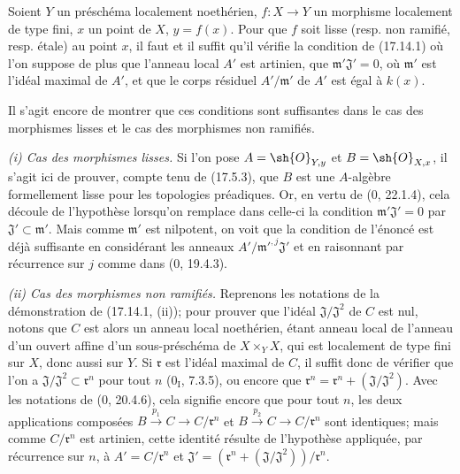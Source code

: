 \begin{proposition}[17.14.2]
\label{IV.17.14.2}
Soient $Y$ un préschéma localement noethérien, $f:X\to Y$ un morphisme localement de type fini, $x$ un point de $X$, $y=f(x)$. Pour que $f$ soit lisse (resp. non ramifié, resp. étale) au point $x$, il faut et il suffit qu'il vérifie la condition de (17.14.1) où l'on suppose de plus que l'anneau local $A'$ est artinien, que $\mathfrak m'\mathfrak{J}'=0$, où $\mathfrak m'$ est l'idéal maximal de $A'$, et que le corps résiduel $A'/\mathfrak m'$ de $A'$ est égal à $k(x)$.
\end{proposition}

Il s'agit encore de montrer que ces conditions sont suffisantes dans le cas des morphismes lisses et le cas des morphismes non ramifiés.


\emph{(i) Cas des morphismes lisses.} Si l'on pose $A=\sh{O}_{Y,y}$ et $B=\sh{O}_{X,x}$, il s'agit ici de prouver, compte tenu de (17.5.3), que $B$ est une $A$-algèbre formellement lisse pour les topologies préadiques. Or, en vertu de (0, 22.1.4), cela découle de l'hypothèse lorsqu'on remplace dans celle-ci la condition $\mathfrak m'\mathfrak{J}'=0$ par $\mathfrak{J}'\subset\mathfrak m'$. Mais comme $\mathfrak m'$ est nilpotent, on voit que la condition de l'énoncé est déjà suffisante en considérant les anneaux $A'/\mathfrak m'^{,j}\mathfrak{J}'$ et en raisonnant par récurrence sur $j$ comme dans (0, 19.4.3).

\emph{(ii) Cas des morphismes non ramifiés.} Reprenons les notations de la démonstration de (17.14.1, (ii)); pour prouver que l'idéal $\mathfrak{J}/\mathfrak{J}^2$ de $C$ est nul, notons que $C$ est alors un anneau local noethérien, étant anneau local de l'anneau d'un ouvert affine d'un sous-préschéma de $X\times_YX$, qui est localement de type fini sur $X$, donc aussi sur $Y$. Si $\mathfrak r$ est l'idéal maximal de $C$, il suffit donc de vérifier que l'on a $\mathfrak{J}/\mathfrak{J}^2\subset\mathfrak r^n$ pour tout $n$ (0$_{\mathrm I}$, 7.3.5), ou encore que $\mathfrak r^n=\mathfrak r^n+(\mathfrak{J}/\mathfrak{J}^2)$. Avec les notations de (0, 20.4.6), cela signifie encore que pour tout $n$, les deux applications composées $B\xrightarrow{p_1}C\to C/\mathfrak r^n$ et $B\xrightarrow{p_2}C\to C/\mathfrak r^n$ sont identiques; mais comme $C/\mathfrak r^n$ est artinien, cette identité résulte de l'hypothèse appliquée, par récurrence sur $n$, à $A'=C/\mathfrak r^n$ et $\mathfrak{J}'=(\mathfrak r^n+(\mathfrak{J}/\mathfrak{J}^2))/\mathfrak r^n$.

